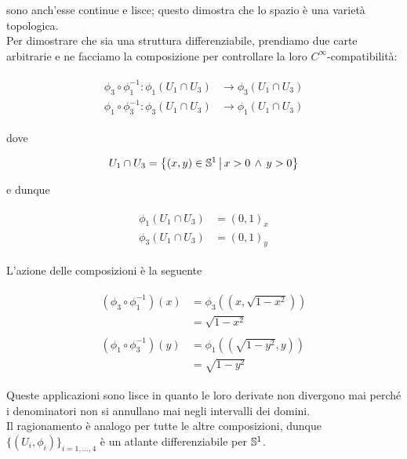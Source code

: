sono anch'esse continue e lisce; questo dimostra che lo spazio è una varietà topologica.\\
Per dimostrare che sia una struttura differenziabile, prendiamo due carte arbitrarie e ne facciamo la composizione per controllare la loro $ C^{\infty} $-compatibilità:

\begin{align}
	\begin{split}
		\phi_{3} \circ \phi_{1}^{-1} : \phi_{1}(U_{1} \cap U_{3}) &\to \phi_{3}(U_{1} \cap U_{3})\\
		\phi_{1} \circ \phi_{3}^{-1} : \phi_{3}(U_{1} \cap U_{3}) &\to \phi_{1}(U_{1} \cap U_{3})
	\end{split}
\end{align}

dove

\begin{equation}
	U_{1} \cap U_{3} = \left\{ (x,y) \in \S^{1} \, \middle| \, x>0 \, \wedge \, y>0  \right\}
\end{equation}

e dunque

\begin{align}
	\begin{split}
		\phi_{1}(U_{1} \cap U_{3}) &= (0,1)_{x}\\
		\phi_{3}(U_{1} \cap U_{3}) &= (0,1)_{y}
	\end{split}
\end{align}

L'azione delle composizioni è la seguente

\begin{align}
	\begin{split}
		(\phi_{3} \circ \phi_{1}^{-1}) (x) &= \phi_{3} ((x,\sqrt{1-x^{2}}))\\
		&= \sqrt{1-x^{2}}\\\\
		(\phi_{1} \circ \phi_{3}^{-1}) (y) &= \phi_{1} ((\sqrt{1-y^{2}},y))\\
		&= \sqrt{1-y^{2}}
	\end{split}
\end{align}

Queste applicazioni sono lisce in quanto le loro derivate non divergono mai perché i denominatori non si annullano mai negli intervalli dei domini.\\
Il ragionamento è analogo per tutte le altre composizioni, dunque $ \{(U_{i},\phi_{i})\}_{i=1,\dots,4} $ è un atlante differenziabile per $ \S^{1} $.

